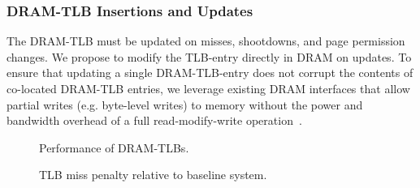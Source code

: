 
\subsubsection{DRAM-TLB Insertions and Updates}

\noindent The DRAM-TLB must be updated on misses, shootdowns, and page
permission changes. We propose to modify the TLB-entry directly in
DRAM on updates. To ensure that updating a single DRAM-TLB-entry does
not corrupt the contents of co-located DRAM-TLB entries, we leverage
existing DRAM interfaces that allow partial writes (e.g. byte-level
writes) to memory without the power and bandwidth overhead of a full
read-modify-write operation~\cite{hbm-spec}.






% 

\begin{figure}[tp] 
  \vspace{-0.in} \centering
  \centerline{}

  \caption{\small Performance of DRAM-TLBs. \normalsize}
  \label{fig:perf_stackedTLB} 
  \vspace{0.2 in}
\end{figure}

\begin{figure}[tp] 
  \vspace{0.in} \centering
  \centerline{}

  \caption{\small TLB miss penalty relative to baseline system.\normalsize}
  \label{fig:tlblat_stackedTLB} 
  \vspace{0.2 in}
\end{figure}

